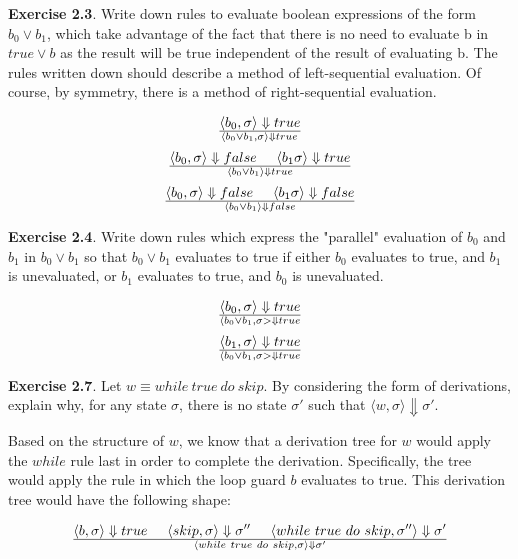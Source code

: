 \documentclass{article}
\begin{document}
\noindent \textbf{Exercise 2.3}. Write down rules to evaluate boolean expressions of the form $b_0 \lor b_1$, which take advantage of the fact that there is no need to evaluate b in $true \lor b$ as the result will be true independent of the result of evaluating b. The rules written down should describe a method of left-sequential evaluation. Of course, by symmetry, there is a method of right-sequential evaluation.

$$
\langle b_0, \sigma \rangle \Downarrow true \over \langle b_0 \lor b_1, \sigma \rangle \Downarrow true \\
$$
$$
\langle b_0, \sigma \rangle \Downarrow false \hspace{5mm} \langle b_ 1 \sigma \rangle \Downarrow true \over
\langle b_0 \lor b_1 \rangle \Downarrow true
$$
$$
\langle b_0, \sigma \rangle \Downarrow false \hspace{5mm} \langle b_ 1 \sigma \rangle \Downarrow false \over
\langle b_0 \lor b_1 \rangle \Downarrow false
$$

\noindent \textbf{Exercise 2.4}. Write down rules which express the "parallel" evaluation of $b_0$ and $b_1$ in $b_0 \lor b_1$ so that $b_0 \lor b_1$ evaluates to true if either $b_0$ evaluates to true, and $b_1$ is unevaluated, or $b_1$ evaluates to true, and $b_0$ is unevaluated.

$$
\langle b_0, \sigma \rangle \Downarrow true \over \langle b_0 \lor b_1, \sigma> \Downarrow true
$$
$$
\langle b_1, \sigma \rangle \Downarrow true \over \langle b_0 \lor b_1, \sigma> \Downarrow true
$$

\noindent \textbf{Exercise 2.7}. Let $w \equiv while~true~do~skip$. By considering the form of derivations,
explain why, for any state $\sigma$, there is no state $\sigma'$ such that $\langle w, \sigma \rangle \Downarrow \sigma'$.

\bigskip
\noindent Based on the structure of $w$, we know that a derivation tree for $w$ would apply the $while$ rule last in order to complete the derivation. Specifically, the tree would apply the rule in which the loop guard $b$ evaluates to true. This derivation tree would have the following shape:

$$
\langle b, \sigma \rangle \Downarrow true \hspace{5mm} \langle skip, \sigma \rangle \Downarrow \sigma'' \hspace{5mm} \langle while~true~do~skip, \sigma'' \rangle \Downarrow \sigma' \over \langle while~true~do~skip, \sigma \rangle \Downarrow \sigma'
$$
\end{document}
